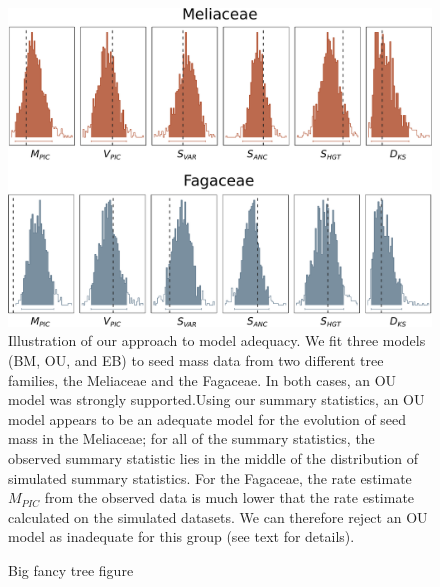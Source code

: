 \documentclass[a4paper,12pt]{article}
\begin{document}
\begin{figure}[p]
  \centering
  \includegraphics[scale=0.5]{figs/two-clade-example}
  \caption{Illustration of our approach to model adequacy. We fit three models (BM, OU, and EB) to seed mass data from two different tree families, the Meliaceae and the Fagaceae. In both cases, an OU model was strongly supported.Using our summary statistics, an OU model appears to be an adequate model for the evolution of seed mass in the Meliaceae; for all of the summary statistics, the observed summary statistic lies in the middle of the distribution of simulated summary statistics. For the Fagaceae, the rate estimate $M_{PIC}$ from the observed data is much lower that the rate estimate calculated on the simulated datasets. We can therefore reject an OU model as inadequate for this group (see text for details).}
  \label{fig:two-clades}
\end{figure}

\begin{figure}[p]
  \centering
  \caption{Big fancy tree figure}
  \label{fig:angio-phylogeny}
\end{figure}
\end{document}
